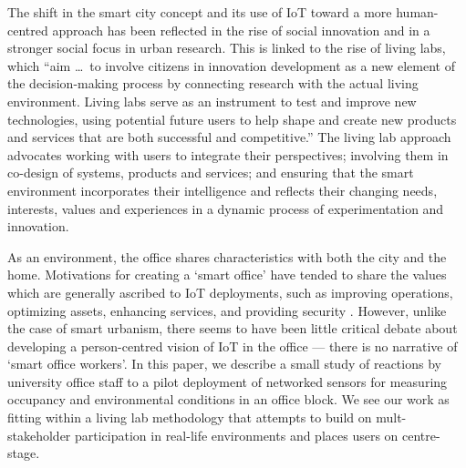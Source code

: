 The shift in the smart city concept and its use of IoT toward a more
human-centred approach \cite{Shin-2017-UTIO} has been reflected in the rise of social
innovation and in a stronger social focus in urban research. This is
linked to the rise of living labs, which “aim \ldots\ to involve citizens
in innovation development as a new element of the decision-making
process by connecting research with the actual living
environment. Living labs serve as an instrument to test and improve
new technologies, using potential future users to help shape and
create new products and services that are both successful and
competitive.” \cite{Franz-2015-DSLL}  The living lab approach
advocates working with users to integrate their perspectives; involving them in co-design
of systems, products and services; and ensuring that the smart environment
incorporates their intelligence and reflects their changing needs,
interests, values and experiences in a dynamic process of
experimentation and innovation.

As an environment, the office shares characteristics with both the
city and the home. Motivations for creating a `smart office' have
tended to share the values which are generally ascribed to IoT
deployments, such as improving operations, optimizing assets, enhancing
services, and providing security
\cite{Heidt-2016-PGFT,Gaur-2015-SCAA,Gubbi-2013-IOT}. However, unlike
the case of smart urbanism, there seems to have been little
critical debate about developing a person-centred vision of IoT in the
office --- there is no narrative of `smart office workers'.  In this
paper, we describe a small study of reactions by university office
staff to a pilot deployment of networked sensors for measuring
occupancy and environmental conditions in an office block. 
We see our work as fitting within a living lab methodology that
attempts to build on mult-stakeholder participation in real-life
environments and places users on centre-stage.
 





